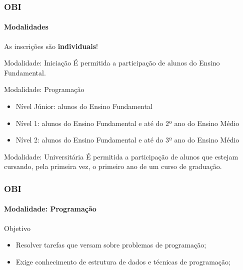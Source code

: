 \begin{frame}
	\frametitle{OBI}
	\framesubtitle{Modalidades}

	\begin{block:fact}{}
			As inscrições são \textbf{individuais}!
	\end{block:fact}
	
	\begin{block:fact}{Modalidade: Iniciação}
		É permitida a participação de alunos do Ensino Fundamental.
  \end{block:fact}
	
	\begin{block:fact}{Modalidade: Programação}
		\begin{itemize}
			\item Nível Júnior: alunos do Ensino Fundamental
			\item Nível 1: alunos do Ensino Fundamental e até do 2º ano do Ensino Médio
			\item Nível 2: alunos do Ensino Fundamental e até do 3º ano do Ensino Médio
		\end{itemize}
  \end{block:fact}

  \begin{block:fact}{Modalidade: Universitária}
		É permitida a participação de alunos que estejam cursando, pela primeira vez,
		o primeiro ano de um curso de graduação.
	\end{block:fact}
\end{frame}


\begin{frame}
	\frametitle{OBI}
	\framesubtitle{Modalidade: Programação}

	\begin{block:fact}{Objetivo}
		\begin{itemize}
			\item Resolver tarefas que versam sobre problemas de programação;
			\item Exige conhecimento de estrutura de dados e técnicas de programação;
		\end{itemize}
	\end{block:fact}

	\hfill
\end{frame}
	

